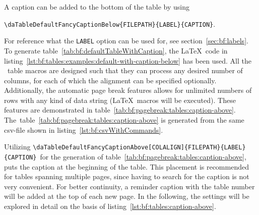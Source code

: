 		A caption can be added to the bottom of the table by using\\[-1cm]		
		\begin{center}
			\lstinline$\daTableDefaultFancyCaptionBelow{FILEPATH}{LABEL}{CAPTION}$.
		\end{center}
		\vspace{-0.5cm}
		For reference what the \lstinline$LABEL$ option can be used for, see \mbox{section \ref{sec:bf:labels}}. To generate \mbox{table \ref{tab:bf:defaultTableWithCaption}}, the \LaTeX~code in \mbox{listing \ref{lst:bf:tables:examples:default-with-caption-below}} has been used.
		All the \productName~table macros are designed such that they can process any desired number of columns, for each of which the alignment can be specified optionally. Additionally, the automatic page break features allows for unlimited numbers of rows with any kind of data string (\LaTeX~macros will be executed). These features are demonstrated in \mbox{table \ref{tab:bf:pagebreak:tables:caption-above}}.
		\mbox{The table \ref{tab:bf:pagebreak:tables:caption-above}} is generated from the same \mbox{csv-file} shown in \mbox{listing \ref{lst:bf:csvWithCommands}}.
		
		
		
		Utilizing \lstinline$\daTableDefaultFancyCaptionAbove[COLALIGN]{FILEPATH}{LABEL}{CAPTION}$~for the generation of \mbox{table \ref{tab:bf:pagebreak:tables:caption-above}}, puts the caption at the beginning of the table. This placement is recommended for tables spanning multiple pages, since having to search for the caption is not very convenient. For better continuity, a reminder caption with the table number will be added at the top of each new page. In the following, the settings will be explored in detail on the basis of \mbox{listing \ref{lst:bf:tables:caption-above}}.
		
